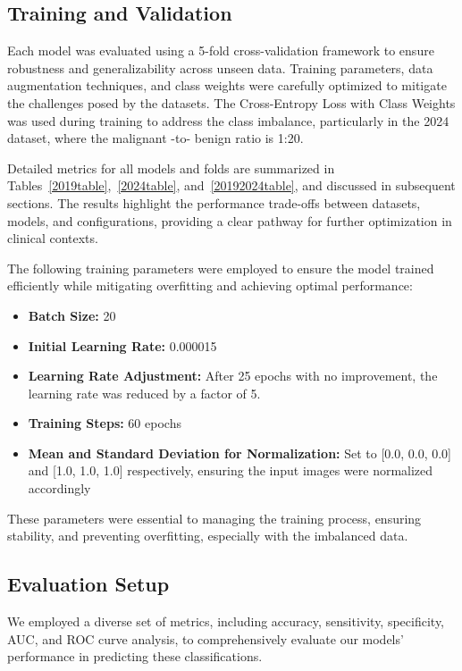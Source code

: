 \documentclass{article}
\begin{document}
\subsection{Training and Validation}

Each model was evaluated using a 5-fold cross-validation framework to ensure robustness and generalizability
across unseen data. Training parameters, data augmentation techniques, and class weights were carefully
optimized to mitigate the challenges posed by the datasets. The Cross-Entropy Loss with Class Weights was
used during training to address the class imbalance, particularly in the 2024 dataset, where the malignant -to-
benign ratio is 1:20.

Detailed metrics for all models and folds are summarized in Tables~\ref{2019table},~\ref{2024table}, and~\ref{20192024table}, and discussed in subsequent
sections. The results highlight the performance trade-offs between datasets, models, and configurations,
providing a clear pathway for further optimization in clinical contexts.

The following training parameters were employed to ensure the model trained efficiently while mitigating
overfitting and achieving optimal performance:

\begin{itemize}
    \item \textbf{Batch Size:} 20
    \item \textbf{Initial Learning Rate:} 0.000015
    \item \textbf{Learning Rate Adjustment:} After 25 epochs with no improvement, the learning rate was reduced by a
factor of 5.
    \item \textbf{Training Steps:} 60 epochs
    \item \textbf{Mean and Standard Deviation for Normalization:} Set to [0.0, 0.0, 0.0] and [1.0, 1.0, 1.0] respectively,
ensuring the input images were normalized accordingly
\end{itemize}

These parameters were essential to managing the training process, ensuring stability, and preventing overfitting,
especially with the imbalanced data.

\subsection{Evaluation Setup}

We employed a diverse set of metrics, including accuracy, sensitivity, specificity, AUC, and ROC curve
analysis, to comprehensively evaluate our models' performance in predicting these classifications.
\end{document}
